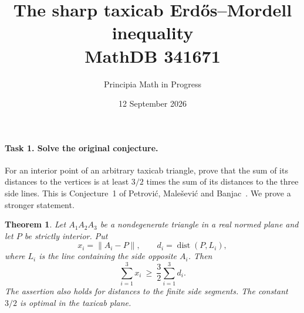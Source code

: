\documentclass[11pt]{article}
\title{The sharp taxicab Erd\H{o}s--Mordell inequality\\
\large MathDB 341671}
\author{Principia Math in Progress}
\date{12 September 2026}
\newtheorem{theorem}{Theorem}
\newcommand{\norm}[1]{\lVert #1\rVert}
\begin{document}
\maketitle

\paragraph{Task 1. Solve the original conjecture.}
For an interior point of an arbitrary taxicab triangle, prove that the
sum of its distances to the vertices is at least \(3/2\) times the sum
of its distances to the three side lines. This is Conjecture~1 of
Petrovi\'c, Male\v sevi\'c and Banjac~\cite{source}.
We prove a stronger statement.

\begin{theorem}\label{thm:main}
Let \(A_1A_2A_3\) be a nondegenerate triangle in a real normed plane
and let \(P\) be strictly interior. Put
\[
x_i=\norm{A_i-P},\qquad d_i=\operatorname{dist}(P,L_i),
\]
where \(L_i\) is the line containing the side opposite \(A_i\). Then
\begin{equation}\label{eq:main}
\sum_{i=1}^3x_i\ \geq\ \frac32\sum_{i=1}^3d_i.
\end{equation}
The assertion also holds for distances to the finite side segments.
The constant \(3/2\) is optimal in the taxicab plane.
\end{theorem}
\end{document}
